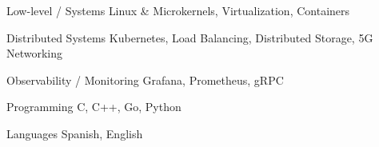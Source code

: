 

\begin{cvskills}
  \cvskill
    {Low-level / Systems} %
    {Linux \& Microkernels, Virtualization, Containers}  %

  \cvskill
    {Distributed Systems} %
    {Kubernetes, Load Balancing, Distributed Storage, 5G Networking} %

  \cvskill
    {Observability / Monitoring} %
    {Grafana, Prometheus, gRPC} %

  \cvskill
    {Programming} %
    {C, C++, Go, Python} %

  \cvskill
    {Languages} %
    {Spanish, English} %

\end{cvskills}
